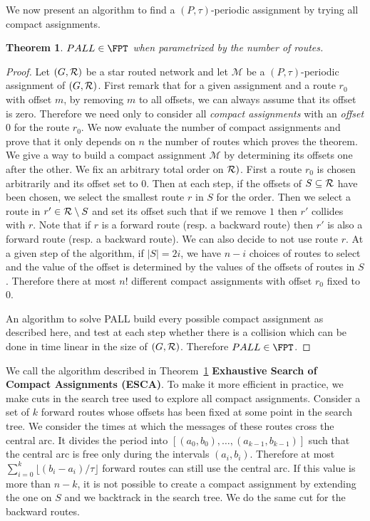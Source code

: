 \documentclass[10pt, conference, letterpaper]{IEEEtran}
\newtheorem{theorem}{Theorem}
\begin{document}
We now present an algorithm to find a $(P,\tau)$-periodic assignment 
by trying all compact assignments.

\begin{theorem}\label{th:FPT}
$PALL \in \FPT$ when parametrized by the number of routes.
\end{theorem}
\begin{proof}
Let $(G, {\cal R})$ be a star routed network and let $\mathcal{M}$ be a $(P,\tau)$-periodic assignment of $(G, {\cal R})$. First remark that for a given assignment and a route $r_0$ with offset $m$, by removing $m$ to all offsets, we can always assume that its offset is zero. Therefore we need only to consider all \emph{compact assignments} with an \emph{offset $0$} for the route $r_0$. 
We now evaluate the number of compact assignments and prove that it only depends
on $n$ the number of routes which proves the theorem. 
We give a way to build a compact assignment $\mathcal{M}$ by determining its offsets one after the other. We fix an arbitrary total order on ${\cal R})$.
First a route $r_0$ is chosen arbitrarily and its offset set to $0$. 
Then at each step, if the offsets of $S \subseteq  {\cal R}$ have been chosen,
we select the smallest route $r$ in $S$ for the order. 
Then we select a route in $r' \in {\cal R} \setminus S$ and set its offset such that 
if we remove $1$ then $r'$ collides with $r$. Note that if $r$ is a forward route (resp. a backward route) then $r'$ is also a forward route (resp. a backward route). We can also decide to 
not use route $r$. At a given step of the algorithm, if $|S| = 2i$, we have $n-i$ choices 
of routes to select and the value of the offset is determined by the values of the offsets of routes in $S$. Therefore there at most $n!$ different compact assignments with offset $r_0$
fixed to $0$. 

An algorithm to solve PALL build every possible compact assignment as described here, and
test at each step whether there is a collision which can be done in time linear in the size of 
$(G, {\cal R})$. Therefore $PALL \in \FPT$.
\end{proof}

We call the algorithm described in Theorem~\ref{th:FPT} \textbf{Exhaustive Search of Compact Assignments (ESCA)}. To make it more efficient in practice, we make cuts in the search tree 
used to explore all compact assignments. Consider a set of $k$ forward routes whose offsets has been fixed at some point in the search tree. We consider the times at which the messages of these routes cross the central arc. It divides the period into $[(a_0,b_0), \dots, (a_{k-1},b_{k-1})]$ such that the central arc is free only during the intervals $(a_i,b_i)$. 
Therefore at most $\displaystyle{ \sum_{i=0}^{k} \lfloor(b_{i} -a_i)/\tau\rfloor} $ forward routes can still use the central arc. If this value is more than $n - k$, it is not possible to create a compact assignment by extending the one on $S$ and we backtrack in the search tree. We do the same cut for the backward routes.
\end{document}

